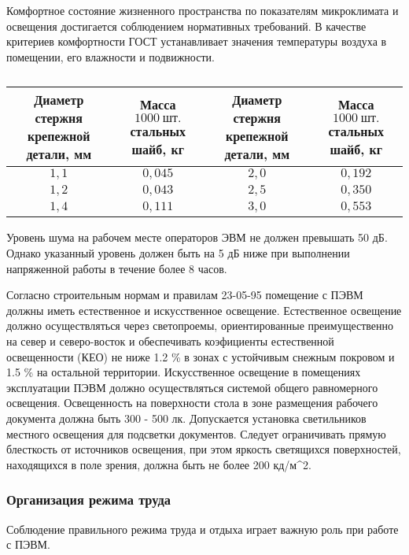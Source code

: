 Комфортное состояние жизненного пространства по показателям микроклимата и освещения достигается соблюдением нормативных требований. В качестве критериев комфортности ГОСТ устанавливает значения температуры воздуха в помещении, его влажности и подвижности.

\begin{table}[b]
	\caption{}
	\label{t:1}
	\begin{tabular}{|c|c|c|c|}
        \hline
        \multicolumn{1}{|p{4cm}|}{Диаметр стержня крепежной детали, мм}&
        \multicolumn{1}{p{4cm}|}{Масса $1000~\text{шт.}$ стальных шайб, кг}&
        \multicolumn{1}{p{4cm}|}{Диаметр стержня крепежной детали, мм}&
        \multicolumn{1}{p{4cm}|}{Масса $1000~\text{шт.}$ стальных шайб,
        кг}\\\hline
        $1{,}1$ & $0{,}045$ & $2{,}0$ & $0{,}192$\\\hline
        $1{,}2$ & $0{,}043$ & $2{,}5$ & $0{,}350$\\\hline
        $1{,}4$ & $0{,}111$ & $3{,}0$ & $0{,}553$\\\hline
    \end{tabular}
\end{table}

Уровень шума на рабочем месте операторов ЭВМ не должен превышать 50 дБ. Однако указанный уровень должен быть на 5 дБ ниже при выполнении напряженной работы в течение более 8 часов.

Согласно строительным нормам и правилам 23-05-95 помещение с ПЭВМ должны иметь естественное и искусственное освещение. Естественное освещение должно осуществляться через светопроемы, ориентированные преимущественно на север и северо-восток и обеспечивать коэфициенты естественной освещенности (КЕО) не ниже 1.2 \% в зонах с устойчивым снежным покровом и 1.5 \% на остальной территории. Искусственное освещение в помещениях эксплуатации ПЭВМ должно осуществляться системой общего равномерного освещения. Освещенность на поверхности стола в зоне размещения рабочего документа должна быть 300 - 500 лк. Допускается установка светильников местного освещения для подсветки документов. Следует ограничивать прямую блесткость от источников освещения, при этом яркость светящихся поверхностей, находящихся в поле зрения, должна быть не более 200 кд/м^2.

\subsubsection{Организация режима труда}
Соблюдение правильного режима труда и отдыха играет важную роль при работе с  ПЭВМ.


